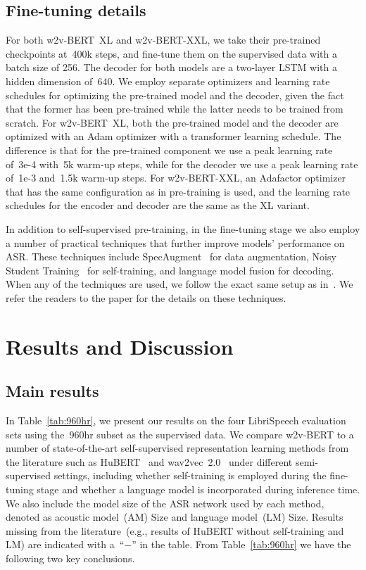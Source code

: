 \documentclass{article}
\begin{document}
\subsection{Fine-tuning details}
 For both w2v-BERT~XL and w2v-BERT-XXL, we take their pre-trained checkpoints at~400k steps, and fine-tune them on the supervised data with a batch size of 256.
The decoder for both models are a two-layer LSTM with a hidden dimension of~640.
We employ separate optimizers and learning rate schedules for optimizing the pre-trained model and the decoder, given the fact that the former has been pre-trained while the latter needs to be trained from scratch.
For w2v-BERT~XL, both the pre-trained model and the decoder are optimized with an Adam optimizer with a transformer learning schedule.
The difference is that for the pre-trained component we use a peak learning rate of~3e-4 with~5k warm-up steps, while for the decoder we use a peak learning rate of~1e-3 and~1.5k warm-up steps.
For w2v-BERT-XXL, an Adafactor optimizer that has the same configuration as in pre-training is used, and the learning rate schedules for the encoder and decoder are the same as the XL variant.


In addition to self-supervised pre-training, in the fine-tuning stage we also employ a number of practical techniques that further improve models' performance on ASR.
These techniques include SpecAugment~\cite{park2019specaugment,park2020specaugment} for data augmentation, Noisy Student Training~\cite{park2020improved} for self-training, and language model fusion for decoding.
When any of the techniques are used, we follow the exact same setup as in~\cite{zhang2020pushing}.
We refer the readers to the paper for the details on these techniques.


\section{Results and Discussion}
\label{sec:results}

\subsection{Main results}
In Table~\ref{tab:960hr}, we present our results on the four LibriSpeech evaluation sets using the~960hr subset as the supervised data.
We compare w2v-BERT to a number of state-of-the-art self-supervised representation learning methods from the literature such as HuBERT~\cite{hsu2021hubert} and wav2vec~2.0~\cite{baevski2020wav2vec} under different semi-supervised settings, including whether self-training is employed during the fine-tuning stage and whether a language model is incorporated during inference time.
We also include the model size of the ASR network used by each method, denoted as acoustic model~(AM) Size and language model~(LM) Size.
Results missing from the literature~(e.g., results of HuBERT without self-training and LM) are indicated with a~``$-$'' in the table.
From Table~\ref{tab:960hr} we have the following two key conclusions.
\end{document}
